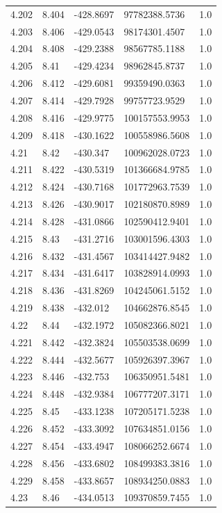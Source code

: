 \begin{tabular}{lllll}
4.202 & 8.404 & -428.8697 & 97782388.5736 & 1.0 \\
4.203 & 8.406 & -429.0543 & 98174301.4507 & 1.0 \\
4.204 & 8.408 & -429.2388 & 98567785.1188 & 1.0 \\
4.205 & 8.41 & -429.4234 & 98962845.8737 & 1.0 \\
4.206 & 8.412 & -429.6081 & 99359490.0363 & 1.0 \\
4.207 & 8.414 & -429.7928 & 99757723.9529 & 1.0 \\
4.208 & 8.416 & -429.9775 & 100157553.9953 & 1.0 \\
4.209 & 8.418 & -430.1622 & 100558986.5608 & 1.0 \\
4.21 & 8.42 & -430.347 & 100962028.0723 & 1.0 \\
4.211 & 8.422 & -430.5319 & 101366684.9785 & 1.0 \\
4.212 & 8.424 & -430.7168 & 101772963.7539 & 1.0 \\
4.213 & 8.426 & -430.9017 & 102180870.8989 & 1.0 \\
4.214 & 8.428 & -431.0866 & 102590412.9401 & 1.0 \\
4.215 & 8.43 & -431.2716 & 103001596.4303 & 1.0 \\
4.216 & 8.432 & -431.4567 & 103414427.9482 & 1.0 \\
4.217 & 8.434 & -431.6417 & 103828914.0993 & 1.0 \\
4.218 & 8.436 & -431.8269 & 104245061.5152 & 1.0 \\
4.219 & 8.438 & -432.012 & 104662876.8545 & 1.0 \\
4.22 & 8.44 & -432.1972 & 105082366.8021 & 1.0 \\
4.221 & 8.442 & -432.3824 & 105503538.0699 & 1.0 \\
4.222 & 8.444 & -432.5677 & 105926397.3967 & 1.0 \\
4.223 & 8.446 & -432.753 & 106350951.5481 & 1.0 \\
4.224 & 8.448 & -432.9384 & 106777207.3171 & 1.0 \\
4.225 & 8.45 & -433.1238 & 107205171.5238 & 1.0 \\
4.226 & 8.452 & -433.3092 & 107634851.0156 & 1.0 \\
4.227 & 8.454 & -433.4947 & 108066252.6674 & 1.0 \\
4.228 & 8.456 & -433.6802 & 108499383.3816 & 1.0 \\
4.229 & 8.458 & -433.8657 & 108934250.0883 & 1.0 \\
4.23 & 8.46 & -434.0513 & 109370859.7455 & 1.0 \\

\end{tabular}
